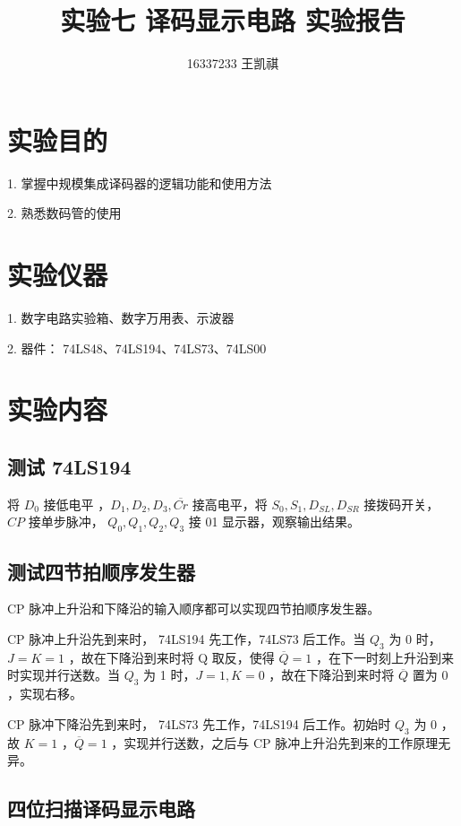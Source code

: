 \documentclass{article}
\begin{document}
\title{实验七 \text{ } 译码显示电路 \text{ } 实验报告}
\author {16337233 王凯祺}
\maketitle

\section{实验目的}

1. 掌握中规模集成译码器的逻辑功能和使用方法

2. 熟悉数码管的使用

\section{实验仪器}

1. 数字电路实验箱、数字万用表、示波器

2. 器件： 74LS48、74LS194、74LS73、74LS00

\section{实验内容}

\subsection{测试 74LS194}

将 $D_0$ 接低电平 ，$D_1, D_2, D_3, \overline{Cr}$ 接高电平，将 $S_0, S_1, D_{SL}, D_{SR}$ 接拨码开关， $CP$ 接单步脉冲， $Q_0, Q_1, Q_2, Q_3$ 接 01 显示器，观察输出结果。

\subsection{测试四节拍顺序发生器}

CP 脉冲上升沿和下降沿的输入顺序都可以实现四节拍顺序发生器。

CP 脉冲上升沿先到来时， 74LS194 先工作，74LS73 后工作。当 $Q_3$ 为 0 时，$J = K = 1$ ，故在下降沿到来时将 Q 取反，使得 $\overline{Q} = 1$ ，在下一时刻上升沿到来时实现并行送数。当 $Q_3$ 为 1 时，$J = 1, K = 0$ ，故在下降沿到来时将 $\overline{Q}$ 置为 0 ，实现右移。

CP 脉冲下降沿先到来时， 74LS73 先工作，74LS194 后工作。初始时 $Q_3$ 为 0 ，故 $K = 1$ ，$\overline{Q} = 1$ ，实现并行送数，之后与 CP 脉冲上升沿先到来的工作原理无异。

\subsection{四位扫描译码显示电路}
\end{document}
